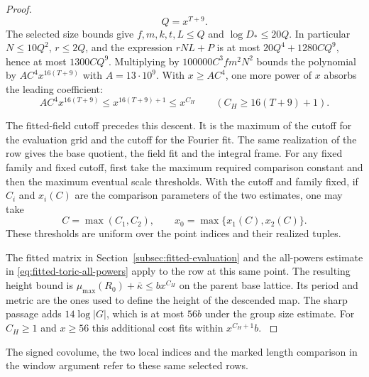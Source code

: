 \begin{proof}
\[
  Q=x^{T+9}.
\]
 The selected size bounds give
\(f,m,k,t,L\le Q\) and \(\log D_*\le20Q\).
In particular \(N\le10Q^2\), \(r\le2Q\), and the expression
\(rNL+P\) is at most \(20Q^4+1280CQ^9\), hence at
most \(1300CQ^9\). Multiplying by \(100000 C^3 f m^2N^2\)
bounds the polynomial by \(A C^4x^{16(T+9)}\) with
\(A=13\cdot10^9\). With \(x\ge AC^4\), one more power of \(x\) absorbs the leading coefficient:
\[
  AC^4x^{16(T+9)}\le x^{16(T+9)+1}\le x^{C_H}\qquad(C_H\ge16(T+9)+1).
\]

The fitted-field cutoff precedes this descent. It is the
maximum of the cutoff for the evaluation grid and the
cutoff for the Fourier fit. The same realization of the row
gives the base quotient, the field fit and the
integral frame. For any fixed family and fixed cutoff,
first take the maximum required comparison constant and
then the maximum eventual scale thresholds.
With the cutoff and family fixed, if \(C_i\) and \(x_i(C)\) are the comparison parameters of the two estimates, one may take
\[
  C=\max(C_1,C_2),\qquad x_0=\max\{x_1(C),x_2(C)\}.
\]
 These thresholds
are uniform over the point indices and their realized tuples.

The fitted matrix in Section~\ref{subsec:fitted-evaluation}
and the all-powers estimate in
\eqref{eq:fitted-toric-all-powers} apply to the row at this same point.
The resulting height bound is
\(\mu_{\max}(R_0)+\bar\kappa\le b x^{C_H}\)
on the parent base lattice. Its period and metric are the ones
used to define the height of the descended map. The sharp passage adds
\(14\log|G|\), which is at most \(56b\) under the group
size estimate. For \(C_H\ge1\) and \(x\ge56\) this
additional cost fits within \(x^{C_H+1}b\).
\label{cor:fitted-row-height-5}

\end{proof}

The signed covolume, the two local indices and the marked length
comparison in the window argument refer to these same selected rows.
